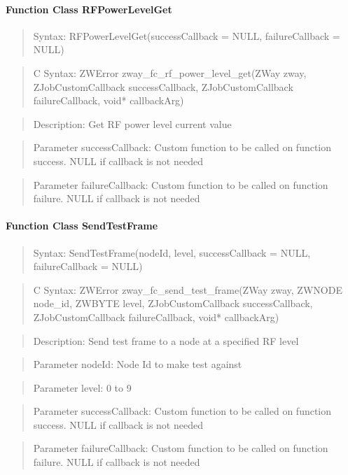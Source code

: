 \paragraph{Function Class RFPowerLevelGet}
\begin{quote}Syntax: RFPowerLevelGet(successCallback = NULL, failureCallback = NULL)\end{quote}
\begin{quote}C Syntax: ZWError zway\_fc\_rf\_power\_level\_get(ZWay zway, ZJobCustomCallback successCallback, ZJobCustomCallback failureCallback, void* callbackArg)\end{quote}
\begin{quote}Description: Get RF power level current value\end{quote}
\begin{quote}Parameter successCallback: Custom function to be called on function success. NULL if callback is not needed\end{quote}
\begin{quote}Parameter failureCallback: Custom function to be called on function failure. NULL if callback is not needed\end{quote}


\paragraph{Function Class SendTestFrame}
\begin{quote}Syntax: SendTestFrame(nodeId, level, successCallback = NULL, failureCallback = NULL)\end{quote}
\begin{quote}C Syntax: ZWError zway\_fc\_send\_test\_frame(ZWay zway, ZWNODE node\_id, ZWBYTE level, ZJobCustomCallback successCallback, ZJobCustomCallback failureCallback, void* callbackArg)\end{quote}
\begin{quote}Description: Send test frame to a node at a specified RF level\end{quote}
\begin{quote}Parameter nodeId: Node Id to make test against\end{quote}
\begin{quote}Parameter level: 0 to 9\end{quote}
\begin{quote}Parameter successCallback: Custom function to be called on function success. NULL if callback is not needed\end{quote}
\begin{quote}Parameter failureCallback: Custom function to be called on function failure. NULL if callback is not needed\end{quote}


